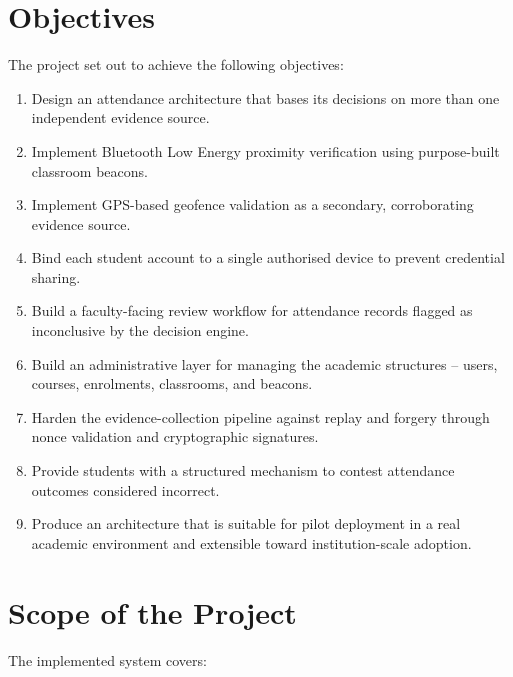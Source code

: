 \documentclass[12pt, a4paper, oneside]{report}
\begin{document}
\section{Objectives}
\label{sec:objectives}

The project set out to achieve the following objectives:

\begin{enumerate}
    \item Design an attendance architecture that bases its decisions on more than one independent evidence source.
    \item Implement Bluetooth Low Energy proximity verification using purpose-built classroom beacons.
    \item Implement GPS-based geofence validation as a secondary, corroborating evidence source.
    \item Bind each student account to a single authorised device to prevent credential sharing.
    \item Build a faculty-facing review workflow for attendance records flagged as inconclusive by the decision engine.
    \item Build an administrative layer for managing the academic structures -- users, courses, enrolments, classrooms, and beacons.
    \item Harden the evidence-collection pipeline against replay and forgery through nonce validation and cryptographic signatures.
    \item Provide students with a structured mechanism to contest attendance outcomes considered incorrect.
    \item Produce an architecture that is suitable for pilot deployment in a real academic environment and extensible toward institution-scale adoption.
\end{enumerate}

\section{Scope of the Project}
\label{sec:scope}

The implemented system covers:
\end{document}
